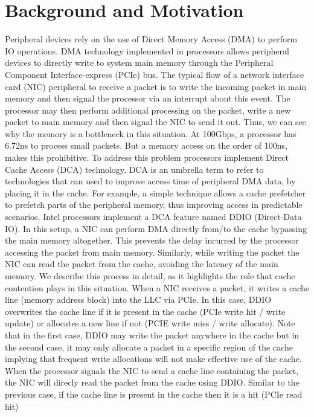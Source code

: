 \documentclass[sigconf,authorversion,noacm]{acmart}
\begin{document}
\section{Background and Motivation}

Peripheral devices rely on the use of Direct Memory Access (DMA) to perform IO
operations. DMA technology implemented in processors allows peripheral devices
to directly write to system main memory through the Peripheral Component
Interface-express (PCIe) bus.
The typical flow of a network interface card (NIC) peripheral to receive a
packet is to write the incoming packet in main memory and then signal the
processor via an interrupt about this event. The processor may then perform
additional processing on the packet, write a new packet to main memory and then
signal the NIC to send it out.
Thus, we can see why the memory is a bottleneck in this situation. At 100Gbps, a
processor has 6.72ns to process small packets. But a memory access on the order
of 100ns, makes this prohibitive. To address this problem processors implement
Direct Cache Access (DCA) technology. DCA is an umbrella term to refer to
technologies that can used to improve access time of peripheral DMA data, by
placing it in the cache.
For example, a simple technique allows a cache prefetcher to prefetch parts of
the peripheral memory, thus improving access in predictable scenarios. Intel
processors implement a DCA feature named DDIO (Direct-Data IO). In this setup, a
NIC can perform DMA directly from/to the cache bypassing the main memory
altogether. This prevents the delay incurred by the processor accessing the
packet from main memory. Similarly, while writing the packet the NIC can read
the packet from the cache, avoiding the latency of the main memory. We describe
this process in detail, as it highlights the role that cache contention plays in
this situation. When a NIC receives a packet, it writes a cache line (memory
address block) into the LLC via PCIe. In this case, DDIO overwrites the cache
line if it is present in the cache (PCIe write hit / write update) or allocates
a new line if not (PCIE write miss / write allocate). Note that in the first
case, DDIO may write the packet anywhere in the cache but in the second case, it
may only allocate a packet in a specific region of the cache implying that
frequent write allocations will not make effective use of the cache. When the
processor signals the NIC to send a cache line containing the packet, the NIC
will direcly read the packet from the cache using DDIO. Similar to the previous
case, if the cache line is present in the cache then it is a hit (PCIe read hit)
\end{document}
